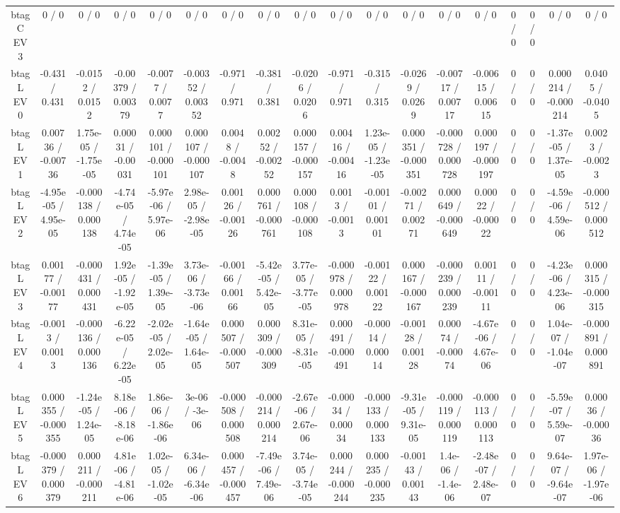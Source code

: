 \documentclass[10pt]{article}
\begin{document}
\begin{table}[htbp]
\begin{center}
\begin{tabular}{|c|c|c|c|c|c|c|c|c|c|c|c|c|c|c|c|c|c|}
  btag C EV 3 & 0 / 0 & 0 / 0 & 0 / 0 & 0 / 0 & 0 / 0 & 0 / 0 & 0 / 0 & 0 / 0 & 0 / 0 & 0 / 0 & 0 / 0 & 0 / 0 & 0 / 0 & 0 / 0 & 0 / 0 & 0 / 0 & 0 / 0 \\ 
  btag L EV 0 & -0.431 / 0.431 & -0.0152 / 0.0152 & -0.00379 / 0.00379 & -0.0077 / 0.0077 & -0.00352 / 0.00352 & -0.971 / 0.971 & -0.381 / 0.381 & -0.0206 / 0.0206 & -0.971 / 0.971 & -0.315 / 0.315 & -0.0269 / 0.0269 & -0.00717 / 0.00717 & -0.00615 / 0.00615 & 0 / 0 & 0 / 0 & 0.000214 / -0.000214 & 0.0405 / -0.0405 \\ 
  btag L EV 1 & 0.00736 / -0.00736 & 1.75e-05 / -1.75e-05 & 0.00031 / -0.00031 & 0.000101 / -0.000101 & 0.000107 / -0.000107 & 0.0048 / -0.0048 & 0.00252 / -0.00252 & 0.000157 / -0.000157 & 0.00416 / -0.00416 & 1.23e-05 / -1.23e-05 & 0.000351 / -0.000351 & -0.000728 / 0.000728 & 0.000197 / -0.000197 & 0 / 0 & 0 / 0 & -1.37e-05 / 1.37e-05 & 0.0023 / -0.0023 \\ 
  btag L EV 2 & -4.95e-05 / 4.95e-05 & -0.000138 / 0.000138 & -4.74e-05 / 4.74e-05 & -5.97e-06 / 5.97e-06 & 2.98e-05 / -2.98e-05 & 0.00126 / -0.00126 & 0.000761 / -0.000761 & 0.000108 / -0.000108 & 0.0013 / -0.0013 & -0.00101 / 0.00101 & -0.00271 / 0.00271 & 0.000649 / -0.000649 & 0.00022 / -0.00022 & 0 / 0 & 0 / 0 & -4.59e-06 / 4.59e-06 & -0.000512 / 0.000512 \\ 
  btag L EV 3 & 0.00177 / -0.00177 & -0.000431 / 0.000431 & 1.92e-05 / -1.92e-05 & -1.39e-05 / 1.39e-05 & 3.73e-06 / -3.73e-06 & -0.00166 / 0.00166 & -5.42e-05 / 5.42e-05 & 3.77e-05 / -3.77e-05 & -0.000978 / 0.000978 & -0.00122 / 0.00122 & 0.000167 / -0.000167 & -0.000239 / 0.000239 & 0.00111 / -0.00111 & 0 / 0 & 0 / 0 & -4.23e-06 / 4.23e-06 & 0.000315 / -0.000315 \\ 
  btag L EV 4 & -0.0013 / 0.0013 & -0.000136 / 0.000136 & -6.22e-05 / 6.22e-05 & -2.02e-05 / 2.02e-05 & -1.64e-05 / 1.64e-05 & 0.000507 / -0.000507 & 0.000309 / -0.000309 & 8.31e-05 / -8.31e-05 & 0.000491 / -0.000491 & -0.00014 / 0.00014 & -0.00128 / 0.00128 & 0.00074 / -0.00074 & -4.67e-06 / 4.67e-06 & 0 / 0 & 0 / 0 & 1.04e-07 / -1.04e-07 & -0.000891 / 0.000891 \\ 
  btag L EV 5 & 0.000355 / -0.000355 & -1.24e-05 / 1.24e-05 & 8.18e-06 / -8.18e-06 & 1.86e-06 / -1.86e-06 & 3e-06 / -3e-06 & -0.000508 / 0.000508 & -0.000214 / 0.000214 & -2.67e-06 / 2.67e-06 & -0.00034 / 0.00034 & -0.000133 / 0.000133 & -9.31e-05 / 9.31e-05 & -0.000119 / 0.000119 & -0.000113 / 0.000113 & 0 / 0 & 0 / 0 & -5.59e-07 / 5.59e-07 & 0.00036 / -0.00036 \\ 
  btag L EV 6 & -0.000379 / 0.000379 & 0.000211 / -0.000211 & 4.81e-06 / -4.81e-06 & 1.02e-05 / -1.02e-05 & 6.34e-06 / -6.34e-06 & 0.000457 / -0.000457 & -7.49e-06 / 7.49e-06 & 3.74e-05 / -3.74e-05 & 0.000244 / -0.000244 & 0.000235 / -0.000235 & -0.00143 / 0.00143 & 1.4e-06 / -1.4e-06 & -2.48e-07 / 2.48e-07 & 0 / 0 & 0 / 0 & 9.64e-07 / -9.64e-07 & 1.97e-06 / -1.97e-06 \\ 

\end{tabular}
\end{center}
\end{table}
\end{document}
